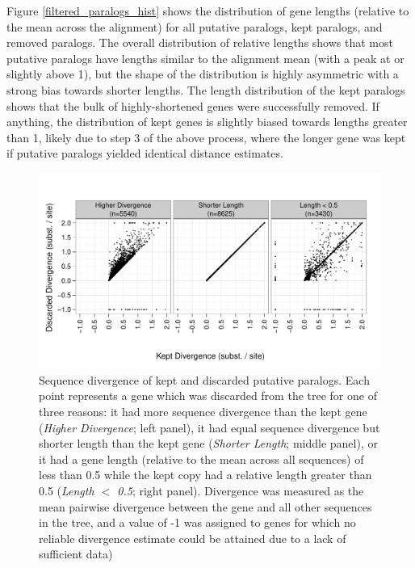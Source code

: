 Figure \ref{filtered_paralogs_hist} shows the distribution of gene
lengths (relative to the mean across the alignment) for all putative
paralogs, kept paralogs, and removed paralogs. The overall
distribution of relative lengths shows that most putative paralogs
have lengths similar to the alignment mean (with a peak at or slightly
above 1), but the shape of the distribution is highly asymmetric with
a strong bias towards shorter lengths. The length distribution of the
kept paralogs shows that the bulk of highly-shortened genes were
successfully removed. If anything, the distribution of kept genes is
slightly biased towards lengths greater than 1, likely due to step 3
of the above process, where the longer gene was kept if putative
paralogs yielded identical distance estimates.

\begin{figure}
\centering
\includegraphics[scale=0.7]{Figs/filtered_paralogs_scatter.pdf}
\caption{Sequence divergence of kept and discarded putative
  paralogs. Each point represents a gene which was discarded from the
  tree for one of three reasons: it had more sequence divergence than
  the kept gene (\emph{Higher Divergence}; left panel), it had equal
  sequence divergence but shorter length than the kept gene
  (\emph{Shorter Length}; middle panel), or it had a gene length
  (relative to the mean across all sequences) of less than 0.5 while
  the kept copy had a relative length greater than 0.5 (\emph{Length
    $<$ 0.5}; right panel). Divergence was measured as the mean
  pairwise divergence between the gene and all other sequences in the
  tree, and a value of -1 was assigned to genes for which no reliable
  divergence estimate could be attained due to a lack of sufficient
  data)}
\label{filtered_paralogs_scatter}
\end{figure}

